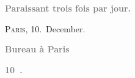 \pstart
           \begin{otherlanguage}{french}\textcolor{gray}{\textbf{\textbf{Paraissant trois fois par jour.}}}\end{otherlanguage}\hfill \textsc{Paris}, 10. December.\pend
           
\pstart
           \begin{otherlanguage}{french}\textcolor{gray}{\textbf{\textbf{Bureau à Paris}}}\end{otherlanguage}\pend
           
\pstart
           \begin{otherlanguage}{french}\textcolor{gray}{\textbf{\textbf{10 .}}}\end{otherlanguage}\pend
           
